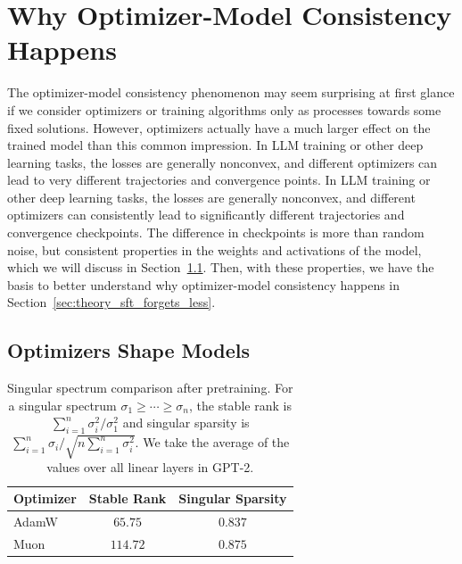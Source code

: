\documentclass{article}
\theoremstyle{remark}
\begin{document}
\section{Why Optimizer-Model Consistency Happens}\label{sec:understanding_phenomenon}
The optimizer-model consistency phenomenon may seem surprising at first glance if we consider optimizers or training algorithms only as processes towards some fixed solutions.
However, optimizers actually have a much larger effect on the trained model than this common impression. In LLM training or other deep learning tasks, the losses are generally nonconvex, and different optimizers can lead to very different trajectories and convergence points. 
In LLM training or other deep learning tasks, the losses are generally nonconvex, and different optimizers can consistently lead to significantly different trajectories and convergence checkpoints. 
The difference in checkpoints is more than random noise, but consistent properties in the weights and activations of the model, which we will discuss in Section~\ref{sec:optimizers_shape_models}. 
Then, with these properties, we have the basis to better understand why optimizer-model consistency happens in Section~\ref{sec:theory_sft_forgets_less}.



\subsection{Optimizers Shape Models}\label{sec:optimizers_shape_models}

\begin{table}
    \centering
    \vspace{-0.3in}
    \caption{Singular spectrum comparison after pretraining. For a singular spectrum $\sigma_1 \ge \cdots \ge \sigma_n$, the stable rank is $\sum_{i=1}^n \sigma_i^2 / \sigma_1^2 $ and singular sparsity is $\sum_{i=1}^n \sigma_i / \sqrt{n\sum_{i=1}^n \sigma_i^2}$. We take the average of the values over all linear layers in GPT-2.}
    \vspace{0.1 in}
    \begin{tabular}{lcc}
    \toprule
    Optimizer & Stable Rank & Singular Sparsity \\ \midrule
    AdamW & $65.75$ & $0.837$ \\ \midrule
    Muon & $114.72$ & $0.875$ \\ 
    \bottomrule
    \end{tabular}
    \vspace{-0.1in}
    \label{tab:stable-rank-comparison}
\end{table}
\end{document}
